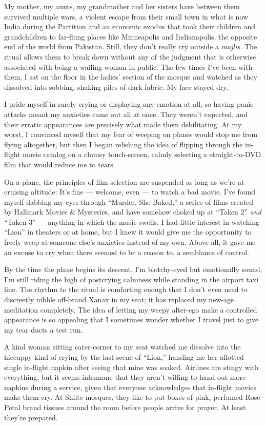 My mother, my aunts, my grandmother and her sisters have between them
survived multiple wars, a violent escape from their small town in what
is now India during the Partition and an economic exodus that took their
children and grandchildren to far-flung places like Minneapolis and
Indianapolis, the opposite end of the world from Pakistan. Still, they
don't really cry outside a \emph{majlis.} The ritual allows them to
break down without any of the judgment that is otherwise associated with
being a wailing woman in public. The few times I've been with them, I
sat on the floor in the ladies' section of the mosque and watched as
they dissolved into sobbing, shaking piles of dark fabric. My face
stayed dry.

I pride myself in rarely crying or displaying any emotion at all, so
having panic attacks meant my anxieties came out all at once. They
weren't expected, and their erratic appearances are precisely what made
them debilitating. At my worst, I convinced myself that my fear of
weeping on planes would stop me from flying altogether, but then I began
relishing the idea of flipping through the in-flight movie catalog on a
clumsy touch-screen, calmly selecting a straight-to-DVD film that would
reduce me to tears.

On a plane, the principles of film selection are suspended as long as
we're at cruising altitude: It's fine --- welcome, even --- to watch a
bad movie. I've found myself dabbing my eyes through ``Murder, She
Baked,'' a series of films created by Hallmark Movies \& Mysteries, and
have somehow choked up at ``Taken 2'' \emph{and} ``Taken 3'' ---
anything in which the music swells. I had little interest in watching
``Lion'' in theaters or at home, but I knew it would give me the
opportunity to freely weep at someone else's anxieties instead of my
own. Above all, it gave me an excuse to cry when there seemed to be a
reason to, a semblance of control.

By the time the plane begins its descent, I'm blotchy-eyed but
emotionally sound; I'm still riding the high of postcrying calmness
while standing in the airport taxi line. The rhythm to the ritual is
comforting enough that I don't even need to discreetly nibble off-brand
Xanax in my seat; it has replaced my new-age meditation completely. The
idea of letting my weepy alter-ego make a controlled appearance is so
appealing that I sometimes wonder whether I travel just to give my tear
ducts a test run.

A kind woman sitting cater-corner to my seat watched me dissolve into
the hiccuppy kind of crying by the last scene of ``Lion,'' handing me
her allotted single in-flight napkin after seeing that mine was soaked.
Airlines are stingy with everything, but it seems inhumane that they
aren't willing to hand out more napkins during a service, given that
everyone acknowledges that in-flight movies make them cry. At Shiite
mosques, they like to put boxes of pink, perfumed Rose Petal brand
tissues around the room before people arrive for prayer. At least
they're prepared.


